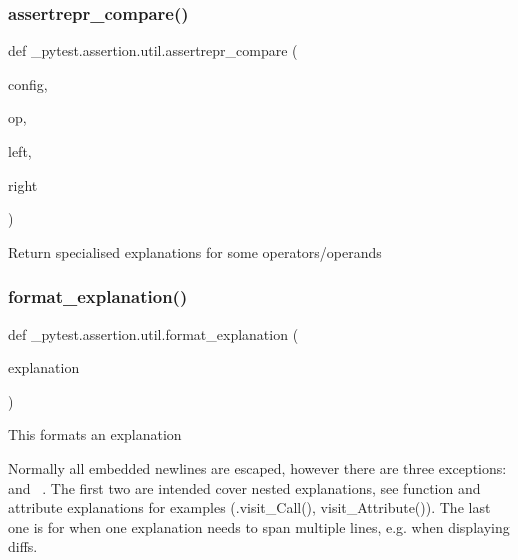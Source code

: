 \subsubsection{\texorpdfstring{assertrepr\+\_\+compare()}{assertrepr\_compare()}}
{\footnotesize\ttfamily def \+\_\+pytest.\+assertion.\+util.\+assertrepr\+\_\+compare (\begin{DoxyParamCaption}\item[{}]{config,  }\item[{}]{op,  }\item[{}]{left,  }\item[{}]{right }\end{DoxyParamCaption})}

\begin{DoxyVerb}Return specialised explanations for some operators/operands\end{DoxyVerb}
 \mbox{\label{namespace__pytest_1_1assertion_1_1util_ad86c7efa3854a6f81fb8b8f7ccc66e79}} 
\subsubsection{\texorpdfstring{format\+\_\+explanation()}{format\_explanation()}}
{\footnotesize\ttfamily def \+\_\+pytest.\+assertion.\+util.\+format\+\_\+explanation (\begin{DoxyParamCaption}\item[{}]{explanation }\end{DoxyParamCaption})}

\begin{DoxyVerb}This formats an explanation

Normally all embedded newlines are escaped, however there are
three exceptions: \n{, \n} and \n~.  The first two are intended
cover nested explanations, see function and attribute explanations
for examples (.visit_Call(), visit_Attribute()).  The last one is
for when one explanation needs to span multiple lines, e.g. when
displaying diffs.
\end{DoxyVerb}
 